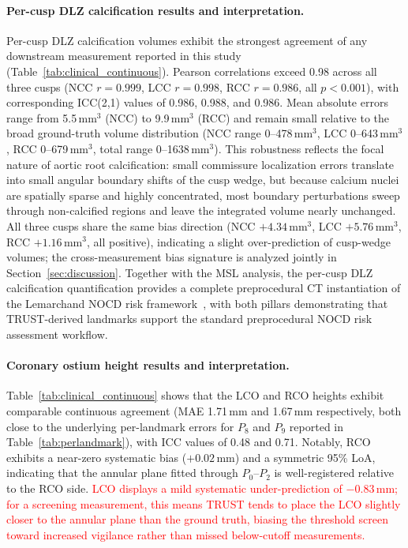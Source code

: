 \documentclass[conference]{IEEEtran}
\begin{document}
\paragraph{Per-cusp DLZ calcification results and interpretation.}
Per-cusp DLZ calcification volumes exhibit the strongest agreement of any downstream measurement reported in this study (Table~\ref{tab:clinical_continuous}). Pearson correlations exceed 0.98 across all three cusps (NCC $r = 0.999$, LCC $r = 0.998$, RCC $r = 0.986$, all $p < 0.001$), with corresponding ICC(2,1) values of 0.986, 0.988, and 0.986. Mean absolute errors range from 5.5\,mm$^3$ (NCC) to 9.9\,mm$^3$ (RCC) and remain small relative to the broad ground-truth volume distribution (NCC range 0--478\,mm$^3$, LCC 0--643\,mm$^3$, RCC 0--679\,mm$^3$, total range 0--1638\,mm$^3$). This robustness reflects the focal nature of aortic root calcification: small commissure localization errors translate into small angular boundary shifts of the cusp wedge, but because calcium nuclei are spatially sparse and highly concentrated, most boundary perturbations sweep through non-calcified regions and leave the integrated volume nearly unchanged. All three cusps share the same bias direction (NCC $+4.34$\,mm$^3$, LCC $+5.76$\,mm$^3$, RCC $+1.16$\,mm$^3$, all positive), indicating a slight over-prediction of cusp-wedge volumes; the cross-measurement bias signature is analyzed jointly in Section~\ref{sec:discussion}. Together with the MSL analysis, the per-cusp DLZ calcification quantification provides a complete preprocedural CT instantiation of the Lemarchand NOCD risk framework~\cite{Lemarchand2023_nocd}, with both pillars demonstrating that TRUST-derived landmarks support the standard preprocedural NOCD risk assessment workflow.

\paragraph{Coronary ostium height results and interpretation.}
Table~\ref{tab:clinical_continuous} shows that the LCO and RCO heights exhibit comparable continuous agreement (MAE 1.71\,mm and 1.67\,mm respectively, both close to the underlying per-landmark errors for $P_8$ and $P_9$ reported in Table~\ref{tab:perlandmark}), with ICC values of 0.48 and 0.71. Notably, RCO exhibits a near-zero systematic bias ($+0.02$\,mm) and a symmetric 95\% LoA, indicating that the annular plane fitted through $P_0$--$P_2$ is well-registered relative to the RCO side. \textcolor{red}{LCO displays a mild systematic under-prediction of $-0.83$\,mm; for a screening measurement, this means TRUST tends to place the LCO slightly closer to the annular plane than the ground truth, biasing the threshold screen toward increased vigilance rather than missed below-cutoff measurements.}
\end{document}
